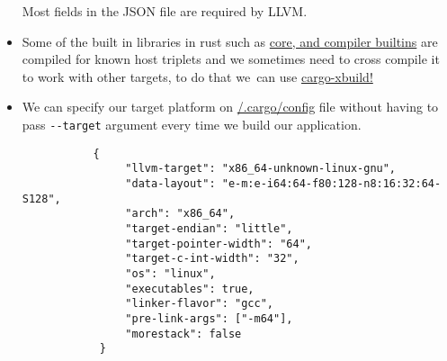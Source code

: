 \documentclass{article}
\begin{document}
\begin{itemize}
    Most fields in the JSON file are required by LLVM.
    \item Some of the built in libraries in rust such as \hyperlink{ref:core-builtins}{core, and compiler builtins} are compiled for known host triplets and we sometimes need to cross compile it to work with other targets, to do that we\
    can use \hyperlink{ref:cargo-xbuild}{cargo-xbuild!}
    \item We can specify our target platform on \hyperlink{ref:cargo-config}{/.cargo/config} file without having to pass \verb|--target| argument every time we build our application.
    \begin{listing}[h]
        \begin{verbatim}
           {
                "llvm-target": "x86_64-unknown-linux-gnu",
                "data-layout": "e-m:e-i64:64-f80:128-n8:16:32:64-S128",
                "arch": "x86_64",
                "target-endian": "little",
                "target-pointer-width": "64",
                "target-c-int-width": "32",
                "os": "linux",
                "executables": true,
                "linker-flavor": "gcc",
                "pre-link-args": ["-m64"],
                "morestack": false
            } 
        \end{verbatim}
    \end{listing} 
 \end{itemize}
\end{document}
